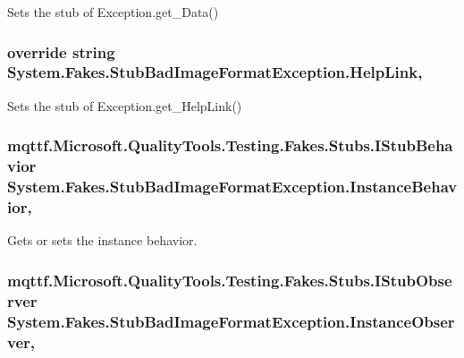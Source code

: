 Sets the stub of Exception.\-get\-\_\-\-Data()

\hypertarget{class_system_1_1_fakes_1_1_stub_bad_image_format_exception_adb62e400184a627636ae5097ef511038}{
\subsubsection[{Help\-Link}]{\setlength{\rightskip}{0pt plus 5cm}override string System.\-Fakes.\-Stub\-Bad\-Image\-Format\-Exception.\-Help\-Link\hspace{0.3cm}{\ttfamily [get]}, {\ttfamily [set]}}}\label{class_system_1_1_fakes_1_1_stub_bad_image_format_exception_adb62e400184a627636ae5097ef511038}


Sets the stub of Exception.\-get\-\_\-\-Help\-Link()

\hypertarget{class_system_1_1_fakes_1_1_stub_bad_image_format_exception_aad9ace9407f86ad349ad367c71963467}{
\subsubsection[{Instance\-Behavior}]{\setlength{\rightskip}{0pt plus 5cm}mqttf.\-Microsoft.\-Quality\-Tools.\-Testing.\-Fakes.\-Stubs.\-I\-Stub\-Behavior System.\-Fakes.\-Stub\-Bad\-Image\-Format\-Exception.\-Instance\-Behavior\hspace{0.3cm}{\ttfamily [get]}, {\ttfamily [set]}}}\label{class_system_1_1_fakes_1_1_stub_bad_image_format_exception_aad9ace9407f86ad349ad367c71963467}


Gets or sets the instance behavior.

\hypertarget{class_system_1_1_fakes_1_1_stub_bad_image_format_exception_a7cfdd6eb805304c083bfec4ccc0acd23}{
\subsubsection[{Instance\-Observer}]{\setlength{\rightskip}{0pt plus 5cm}mqttf.\-Microsoft.\-Quality\-Tools.\-Testing.\-Fakes.\-Stubs.\-I\-Stub\-Observer System.\-Fakes.\-Stub\-Bad\-Image\-Format\-Exception.\-Instance\-Observer\hspace{0.3cm}{\ttfamily [get]}, {\ttfamily [set]}}}\label{class_system_1_1_fakes_1_1_stub_bad_image_format_exception_a7cfdd6eb805304c083bfec4ccc0acd23}


